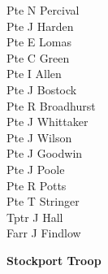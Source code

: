 \begin{multicols}{2}
  Pte N Percival \\
  Pte J Harden \\
  Pte E Lomas \\
  Pte C Green \\
  Pte I Allen \\
  Pte J Bostock \\
  Pte R Broadhurst \\
  Pte J Whittaker \\
  Pte J Wilson \\
  Pte J Goodwin \\
  Pte J Poole \\
  Pte R Potts \\
  Pte T Stringer \\
  Tptr J Hall \\
  Farr J Findlow \\
\end{multicols}

\begin{center}
  \Large
  \textbf{Stockport Troop}
\end{center}

